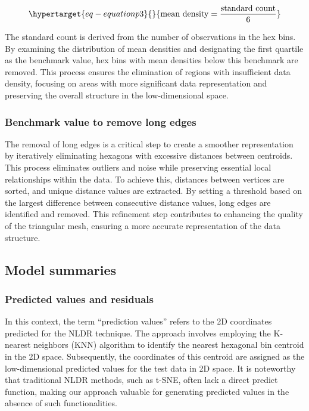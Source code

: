 \documentclass[
  12pt]{article}
\begin{document}
\begin{equation}\protect\hypertarget{eq-equationp3}{}{
\text{mean density} = \frac{\text{standard count}}{6} 
}\label{eq-equationp3}\end{equation}

The standard count is derived from the number of observations in the hex
bins. By examining the distribution of mean densities and designating
the first quartile as the benchmark value, hex bins with mean densities
below this benchmark are removed. This process ensures the elimination
of regions with insufficient data density, focusing on areas with more
significant data representation and preserving the overall structure in
the low-dimensional space.

\hypertarget{benchmark-value-to-remove-long-edges}{%
\subsubsection{Benchmark value to remove long
edges}\label{benchmark-value-to-remove-long-edges}}

The removal of long edges is a critical step to create a smoother
representation by iteratively eliminating hexagons with excessive
distances between centroids. This process eliminates outliers and noise
while preserving essential local relationships within the data. To
achieve this, distances between vertices are sorted, and unique distance
values are extracted. By setting a threshold based on the largest
difference between consecutive distance values, long edges are
identified and removed. This refinement step contributes to enhancing
the quality of the triangular mesh, ensuring a more accurate
representation of the data structure.

\hypertarget{sec-summary}{%
\subsection{Model summaries}\label{sec-summary}}

\hypertarget{predicted-values-and-residuals}{%
\subsubsection{Predicted values and
residuals}\label{predicted-values-and-residuals}}

In this context, the term ``prediction values'' refers to the 2D
coordinates predicted for the NLDR technique. The approach involves
employing the K-nearest neighbors (KNN) algorithm to identify the
nearest hexagonal bin centroid in the 2D space. Subsequently, the
coordinates of this centroid are assigned as the low-dimensional
predicted values for the test data in 2D space. It is noteworthy that
traditional NLDR methods, such as t-SNE, often lack a direct predict
function, making our approach valuable for generating predicted values
in the absence of such functionalities.
\end{document}
